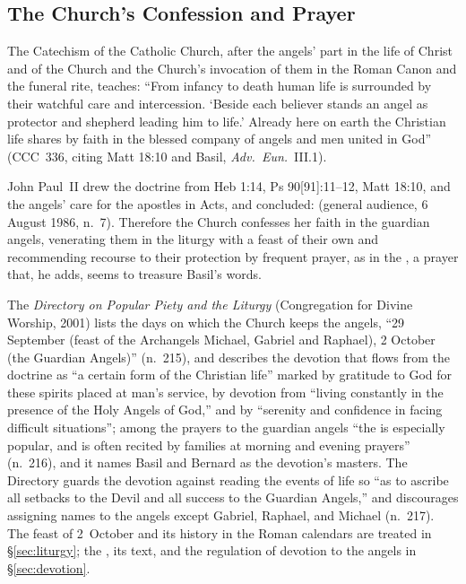 \sectionguard
\subsection{The Church's Confession and Prayer}\label{sec:gd-church}

The Catechism of the Catholic Church, after the angels' part in the life of
Christ and of the Church and the Church's invocation of them in the Roman
Canon and the funeral rite, teaches: ``From infancy to death human life is
surrounded by their watchful care and intercession. `Beside each believer
stands an angel as protector and shepherd leading him to life.' Already here
on earth the Christian life shares by faith in the blessed company of angels
and men united in God'' (CCC~336, citing Matt 18:10 and Basil,
\emph{Adv.\ Eun.}\ III.1).

John Paul~II drew the doctrine from Heb 1:14, Ps 90[91]:11--12, Matt 18:10, and
the angels' care for the apostles in Acts, and concluded:  (general audience, 6 August
1986, n.~7). Therefore the Church confesses her faith in the guardian angels,
venerating them in the liturgy with a feast of their own and recommending
recourse to their protection by frequent prayer, as in the , a prayer that, he adds, seems to treasure Basil's words.

The \emph{Directory on Popular Piety and the Liturgy} (Congregation for Divine
Worship, 2001) lists the days on which the Church keeps the angels, ``29
September (feast of the Archangels Michael, Gabriel and Raphael), 2 October
(the Guardian Angels)'' (n.~215), and describes the devotion that flows from
the doctrine as ``a certain form of the Christian life'' marked by gratitude
to God for these spirits placed at man's service, by devotion from ``living
constantly in the presence of the Holy Angels of God,'' and by ``serenity
and confidence in facing difficult situations''; among the prayers to the
guardian angels ``the  is especially popular, and is often recited
by families at morning and evening prayers'' (n.~216), and it names Basil
and Bernard as the devotion's masters. The Directory guards the devotion against
reading the events of life so ``as to ascribe all setbacks to the Devil and
all success to the Guardian Angels,'' and discourages assigning names to the
angels except Gabriel, Raphael, and Michael (n.~217). The feast of 2~October
and its history in the Roman calendars are treated in \S\ref{sec:liturgy};
the , its text, and the regulation of devotion to the
angels in \S\ref{sec:devotion}.

